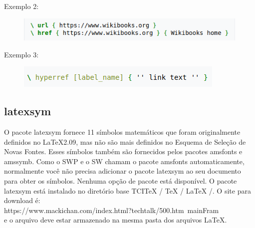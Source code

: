 \documentclass[12pt]{article}
\begin{document}
			Exemplo 2: 
			\begin{figure}[h]
				\centering
				\includegraphics[scale=0.6]{si.png}
			\end{figure}
		
			Exemplo 3:
			\begin{figure}[h]
				\centering
				\includegraphics[scale=0.6]{f.png}
			\end{figure}
		
		\subsection{latexsym}
			O pacote latexsym fornece 11 símbolos matemáticos que foram originalmente definidos no LaTeX2.09, mas não são mais definidos no Esquema de Seleção de Novas Fontes. 
			Esses símbolos também são fornecidos pelos pacotes amsfonts e amssymb. Como o SWP e o SW chamam o pacote amsfonts automaticamente, normalmente você não precisa adicionar o pacote latexsym ao seu documento para obter os símbolos. Nenhuma opção de pacote está disponível. O pacote latexsym está instalado no diretório base TCITeX / TeX / LaTeX /. O site para download é:\\
			https://www.mackichan.com/index.html?techtalk/500.htm~mainFram\\ e o arquivo deve estar armazenado na mesma pasta dos arquivos LaTeX.
		
\end{document}
